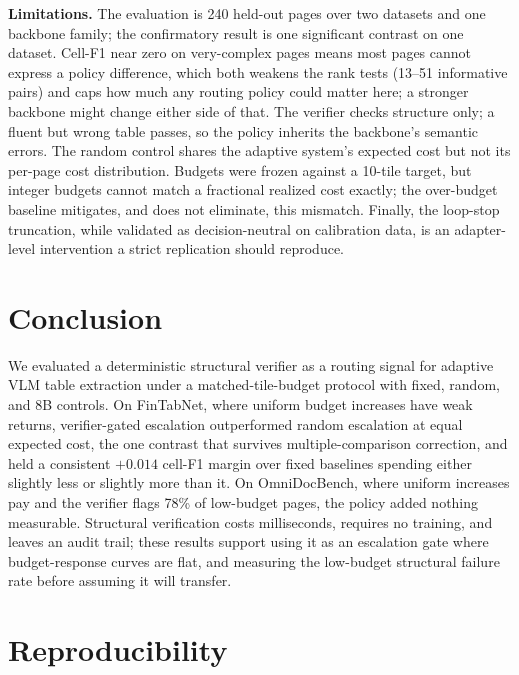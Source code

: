 \documentclass[conference]{IEEEtran}
\begin{document}
\textbf{Limitations.} The evaluation is 240 held-out pages over two
datasets and one backbone family; the confirmatory result is one
significant contrast on one dataset. Cell-F1 near zero on very-complex
pages means most pages cannot express a policy difference, which both
weakens the rank tests (13--51 informative pairs) and caps how much any
routing policy could matter here; a stronger backbone might change either
side of that. The verifier checks structure only; a fluent but wrong
table passes, so the policy inherits the backbone's semantic errors. The
random control shares the adaptive system's expected cost but not its
per-page cost distribution. Budgets were frozen against a 10-tile target,
but integer budgets cannot match a fractional realized cost exactly; the
over-budget baseline mitigates, and does not eliminate, this mismatch.
Finally, the loop-stop truncation, while validated as decision-neutral on
calibration data, is an adapter-level intervention a strict replication
should reproduce.

\section{Conclusion}
\label{sec:conclusion}

We evaluated a deterministic structural verifier as a routing signal for
adaptive VLM table extraction under a matched-tile-budget protocol with
fixed, random, and 8B controls. On FinTabNet, where uniform budget
increases have weak returns, verifier-gated escalation outperformed
random escalation at equal expected cost, the one contrast that
survives multiple-comparison correction, and held a consistent
$+0.014$ cell-F1 margin over fixed baselines spending either slightly
less or slightly more than it. On OmniDocBench, where uniform increases
pay and the verifier flags 78\% of low-budget pages, the policy added
nothing measurable. Structural verification costs milliseconds, requires
no training, and leaves an audit trail; these results support using it as
an escalation gate where budget-response curves are flat, and measuring
the low-budget structural failure rate before assuming it will transfer.

\section*{Reproducibility}
\end{document}
